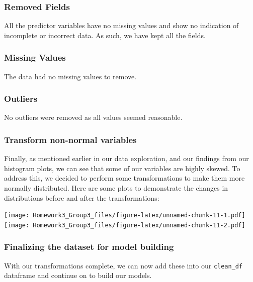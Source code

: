 \documentclass[
]{article}
\begin{document}
\hypertarget{removed-fields}{%
\subsubsection{Removed Fields}\label{removed-fields}}

All the predictor variables have no missing values and show no
indication of incomplete or incorrect data. As such, we have kept all
the fields.

\hypertarget{missing-values}{%
\subsubsection{Missing Values}\label{missing-values}}

The data had no missing values to remove.

\hypertarget{outliers}{%
\subsubsection{Outliers}\label{outliers}}

No outliers were removed as all values seemed reasonable.

\hypertarget{transform-non-normal-variables}{%
\subsubsection{Transform non-normal
variables}\label{transform-non-normal-variables}}

Finally, as mentioned earlier in our data exploration, and our findings
from our histogram plots, we can see that some of our variables are
highly skewed. To address this, we decided to perform some
transformations to make them more normally distributed. Here are some
plots to demonstrate the changes in distributions before and after the
transformations:

\texttt{[image: Homework3\_Group3\_files/figure-latex/unnamed-chunk-11-1.pdf]}
\texttt{[image: Homework3\_Group3\_files/figure-latex/unnamed-chunk-11-2.pdf]}

\hypertarget{finalizing-the-dataset-for-model-building}{%
\subsubsection{Finalizing the dataset for model
building}\label{finalizing-the-dataset-for-model-building}}

With our transformations complete, we can now add these into our
\texttt{clean\_df} dataframe and continue on to build our models.
\end{document}
